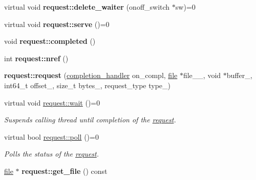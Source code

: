 \begin{CompactItemize}
\item 
\hypertarget{group__iolayer_g30252a01456b49135c054dde2b8e8c6d}{
virtual void \textbf{request::delete\_\-waiter} (onoff\_\-switch $\ast$sw)=0}
\label{group__iolayer_g30252a01456b49135c054dde2b8e8c6d}

\item 
\hypertarget{group__iolayer_g47a70e642437bd2a3cdcb2f64e269fcb}{
virtual void \textbf{request::serve} ()=0}
\label{group__iolayer_g47a70e642437bd2a3cdcb2f64e269fcb}

\item 
\hypertarget{group__iolayer_gdae52da05a69bea331d1161156159b06}{
void \textbf{request::completed} ()}
\label{group__iolayer_gdae52da05a69bea331d1161156159b06}

\item 
\hypertarget{group__iolayer_g11bad6558be8c299ed7c14f0ed9e62d2}{
int \textbf{request::nref} ()}
\label{group__iolayer_g11bad6558be8c299ed7c14f0ed9e62d2}

\item 
\hypertarget{group__iolayer_g31f7e409bd2e9ade994975b3752f33d1}{
\textbf{request::request} (\hyperlink{classcompletion__handler}{completion\_\-handler} on\_\-compl, \hyperlink{classfile}{file} $\ast$file\_\-\_\-, void $\ast$buffer\_\-, int64\_\-t offset\_\-, size\_\-t bytes\_\-, request\_\-type type\_\-)}
\label{group__iolayer_g31f7e409bd2e9ade994975b3752f33d1}

\item 
\hypertarget{group__iolayer_g2cdb5763d21b553ae816eb4152e5d89b}{
virtual void \hyperlink{group__iolayer_g2cdb5763d21b553ae816eb4152e5d89b}{request::wait} ()=0}
\label{group__iolayer_g2cdb5763d21b553ae816eb4152e5d89b}

\begin{CompactList}\small\item\em Suspends calling thread until completion of the \hyperlink{classrequest}{request}. \item\end{CompactList}\item 
virtual bool \hyperlink{group__iolayer_ge93809a6f19558a9f0f98f50cd69aa2f}{request::poll} ()=0
\begin{CompactList}\small\item\em Polls the status of the \hyperlink{classrequest}{request}. \item\end{CompactList}\item 
\hypertarget{group__iolayer_g1791fb9aa3161faec8b1660e01525e26}{
\hyperlink{classfile}{file} $\ast$ \textbf{request::get\_\-file} () const }
\label{group__iolayer_g1791fb9aa3161faec8b1660e01525e26}


\end{CompactItemize}
